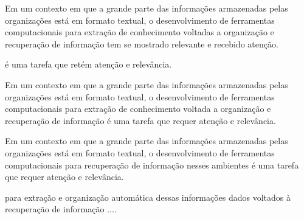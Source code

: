 
Em um contexto em que a grande parte das informações armazenadas pelas organizações está em formato textual, o desenvolvimento de ferramentas computacionais para extração de  conhecimento voltadas a organização e recuperação de informação tem se mostrado relevante e recebido atenção.

é uma tarefa que retém  atenção e relevância.


















































Em um contexto em que a grande parte das informações armazenadas pelas organizações está em formato textual, o desenvolvimento de ferramentas computacionais para extração de  conhecimento voltada a organização e recuperação de informação é uma tarefa que requer atenção e relevância.









Em um contexto em que a grande parte das informações armazenadas pelas organizações está em formato textual, o desenvolvimento de ferramentas computacionais para recuperação de informação nesses ambientes é uma tarefa que requer atenção e relevância.

para extração e organização automática dessas informações 
dados voltados à recuperação de informação .... 














